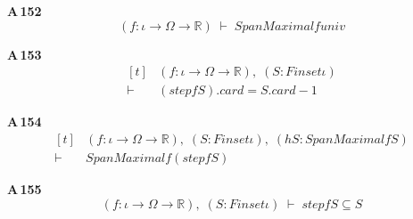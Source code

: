 \noindent\textbf{A\,152}\quad{}
{\footnotesize\[ (\mathit{f} : \iota \to \Omega \to \mathbb{R} ) \;\vdash\; \mathit{SpanMaximal} \mathit{f} \mathit{univ} \]}

\noindent\textbf{A\,153}\quad{}
{\footnotesize\[ \begin{aligned}[t]
&(\mathit{f} : \iota \to \Omega \to \mathbb{R} ),\; (\mathit{S} : \mathit{Finset} \iota )\\
\vdash\;&(\mathit{step} \mathit{f} \mathit{S}).\mathit{card} = \mathit{S}.\mathit{card} - 1
\end{aligned} \]}

\noindent\textbf{A\,154}\quad{}
{\footnotesize\[ \begin{aligned}[t]
&(\mathit{f} : \iota \to \Omega \to \mathbb{R} ),\; (\mathit{S} : \mathit{Finset} \iota ),\; (\mathit{hS} : \mathit{SpanMaximal} \mathit{f} \mathit{S})\\
\vdash\;&\mathit{SpanMaximal} \mathit{f} (\mathit{step} \mathit{f} \mathit{S})
\end{aligned} \]}

\noindent\textbf{A\,155}\quad{}
{\footnotesize\[ (\mathit{f} : \iota \to \Omega \to \mathbb{R} ),\; (\mathit{S} : \mathit{Finset} \iota ) \;\vdash\; \mathit{step} \mathit{f} \mathit{S} \subseteq \mathit{S} \]}
